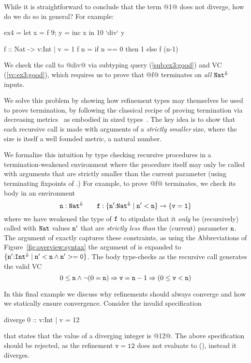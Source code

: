 %
While it is straightforward to conclude that the term @1@ 
does not diverge, how do we do so in general?
%
For example:
%
\begin{code}
  ex4 = let {x = f 9; y = inc x} in 10 `div` y
  
  f   :: Nat -> {v:Int | v = 1}
  f n = if n == 0 then 1 else f (n-1)
\end{code}
%
We check the call to @div@ via subtyping query (\ref{sub:ex3:good}) and 
VC (\ref{vc:ex3:good}), which requires us to prove that @f@ terminates on
\emph{all} ${\mathtt{Nat}}^{\Downarrow}$ inputs.

We solve this problem by showing how
refinement types may themselves be 
used to prove termination, by following
the classical recipe of proving termination 
via decreasing metrics~\cite{Turing36}
as embodied in sized types~\cite{HughesParetoSabry96,XiTerminationLICS01}.
%
The key idea is to show that each 
recursive call is made with arguments 
of a \emph{strictly smaller} size, 
where the size is itself a well 
founded metric, \eg a natural number.

We formalize this intuition by type checking
recursive procedures in a {termination-weakened environment}
where the procedure itself may only be called with arguments 
that are strictly smaller than the current parameter 
(using terminating fixpoints of .)
%
For example, to prove @f@ terminates, we check its body in an environment 
%
$${\mathtt{n}} : {{\mathtt{Nat}}^{\Downarrow}} \qquad {\ensuremath{\mathtt{f}}} : {\mathtt{\{\mathtt{n'}\text{:}{\mathtt{Nat}}^{\Downarrow}\mid {\mathtt{n'}< \ensuremath{\mathtt{n}}}\}} \rightarrow \mathtt{\{v=1\}}}$$
%
where we have weakened the type of $\mathtt{f}$ to stipulate that it 
\emph{only} be (recursively) called with $\mathtt{Nat}$ values $\mathtt{n'}$ that are 
\emph{strictly less than} the (current) parameter $\mathtt{n}$. 
The argument of \ttf exactly captures these constraints, 
as using the Abbreviations of Figure~\ref{fig:overview:syntax}
the argument of \ttf is expanded to 
$\ttreft{\ttnp}{\FinTy{\tint}}{\ttnp < \ttn \land \ttnp >= 0}$.
The body
type-checks as the recursive call generates the valid VC
%
$$0 \leq \mathtt{n} \wedge \lnot (0 = \mathtt{n})  \Rightarrow \mathtt{v} = \mathtt{n} - 1 \Rightarrow (0 \leq \mathtt{v} < \mathtt{n})$$

In this final example we discuss why refinements should always converge
and how we statically ensure convergence.
%
Consider the invalid specification
\begin{code}
  diverge 0 :: {v:Int | v = 12}
\end{code}
that states that the value of a diverging integer is @12@.
%
The above specification should be rejected, 
as the refinement $\mathtt{v = 12}$ does not evaluate to \etrue 
(),
instead it diverges.

